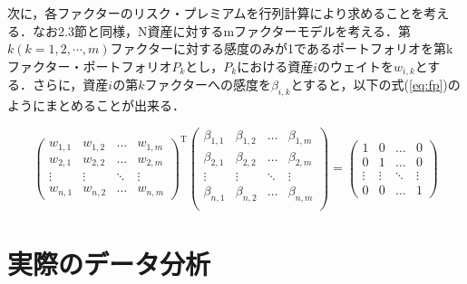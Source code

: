 \documentclass[11pt]{jreport}
\begin{document}
次に，各ファクターのリスク・プレミアムを行列計算により求めることを考える．なお2.3節と同様，N資産に対するmファクターモデルを考える．第$k(k=1,2,\cdots,m)$ファクターに対する感度のみが1であるポートフォリオを第kファクター・ポートフォリオ$P_k$とし，$P_k$における資産$i$のウェイトを$w_{i,k}$とする．さらに，資産$i$の第$k$ファクターへの感度を$\beta_{i,k}$とすると，以下の式(\ref{eq:fp})のようにまとめることが出来る．

\begin{equation}
\left(
	\begin{array}{cccc}
	w_{1,1} & w_{1,2} & \ldots & w_{1,m}\\
	w_{2,1} & w_{2,2} & \ldots & w_{2,m}\\
	\vdots & \vdots & \ddots & \vdots\\
	w_{n,1} & w_{n,2} & \ldots & w_{n,m}
	\end{array}
\right)^{\mathrm{T}}
\left(
	\begin{array}{cccc}
	\beta_{1,1} & \beta_{1,2} & \ldots & \beta_{1,m}\\
	\beta_{2,1} & \beta_{2,2} & \ldots & \beta_{2,m}\\
	\vdots & \vdots & \ddots & \vdots\\
	\beta_{n,1} & \beta_{n,2} & \ldots & \beta_{n,m}\\
	\end{array}
\right)=
\left(
	\begin{array}{cccc}
	1 & 0 & \ldots & 0\\
	0 & 1 & \ldots & 0\\
	\vdots & \vdots & \ddots & \vdots \\
	0 & 0 & \ldots & 1
	\end{array}
\right)
\label{eq:fp}
\end{equation}


\chapter{実際のデータ分析}
\end{document}
